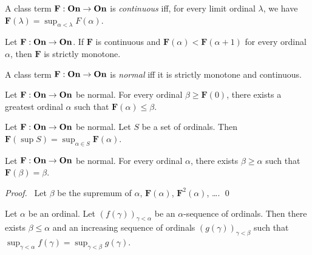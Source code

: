 \begin{definition}
    A class term $\mathbf{F} : \mathbf{On} \rightarrow \mathbf{On}$ is
    \emph{continuous} iff, for every limit ordinal $\lambda$,
    we have $\mathbf{F}(\lambda) = \sup_{\alpha < \lambda} F(\alpha)$.
\end{definition}

\begin{theorem}
    Let $\mathbf{F} : \mathbf{On} \rightarrow \mathbf{On}$. If $\mathbf{F}$ is continuous
    and $\mathbf{F}(\alpha) < \mathbf{F}(\alpha + 1)$ for every ordinal $\alpha$,
    then $\mathbf{F}$ is strictly monotone.
\end{theorem}

\begin{definition}
    A class term $\mathbf{F} : \mathbf{On} \rightarrow \mathbf{On}$ is \emph{normal}
    iff it is strictly monotone and continuous.
\end{definition}

\begin{theorem}
    Let $\mathbf{F} : \mathbf{On} \rightarrow \mathbf{On}$ be normal. For every
    ordinal $\beta \geq \mathbf{F}(0)$, there exists a greatest
    ordinal $\alpha$ such that $\mathbf{F}(\alpha) \leq \beta$.
\end{theorem}

\begin{theorem}
    Let $\mathbf{F} : \mathbf{On} \rightarrow \mathbf{On}$ be normal.
    Let $S$ be a set of ordinals. Then $\mathbf{F}(\sup S) = \sup_{\alpha \in S} \mathbf{F}(\alpha)$.
\end{theorem}

\begin{theorem}
    Let $\mathbf{F} : \mathbf{On} \rightarrow \mathbf{On}$ be normal.
    For every ordinal $\alpha$, there exists $\beta \geq \alpha$
    such that $\mathbf{F}(\beta) = \beta$.
\end{theorem}

\begin{proof}
    \pf\ Let $\beta$ be the supremum of $\alpha$, $\mathbf{F}(\alpha)$, $\mathbf{F}^2(\alpha)$, \ldots. \qed
\end{proof}

\begin{lemma}
    Let $\alpha$ be an ordinal. Let $(f(\gamma))_{\gamma < \alpha}$
    be an $\alpha$-sequence of ordinals. Then there exists $\beta \leq \alpha$
    and an increasing sequence of ordinals $(g(\gamma))_{\gamma < \beta}$
    such that $\sup_{\gamma < \alpha} f(\gamma) = \sup_{\gamma < \beta} g(\gamma)$.
\end{lemma}


